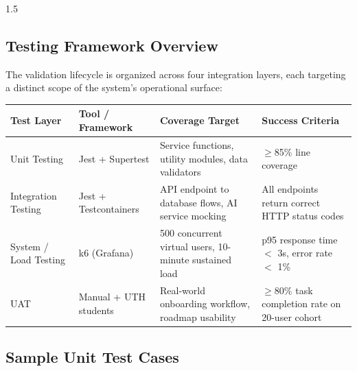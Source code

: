 \documentclass[12pt,a4paper]{report}
\begin{document}
\begin{spacing}{1.5}
		\subsection{Testing Framework Overview}
		
		The validation lifecycle is organized across four integration layers, each targeting a distinct scope of the system's operational surface:
		
		\begin{longtable}{|p{3cm}|p{3cm}|p{4cm}|p{5cm}|}
			\hline
			\rowcolor{gray!20}\textbf{Test Layer} & \textbf{Tool / Framework} & \textbf{Coverage Target} & \textbf{Success Criteria} \\ \hline
			Unit Testing & Jest + Supertest & Service functions, utility modules, data validators & $\geq$85\% line coverage \\ \hline
			Integration Testing & Jest + Testcontainers & API endpoint to database flows, AI service mocking & All endpoints return correct HTTP status codes \\ \hline
			System / Load Testing & k6 (Grafana) & 500 concurrent virtual users, 10-minute sustained load & p95 response time $<$ 3s, error rate $<$ 1\% \\ \hline
			UAT & Manual + UTH students & Real-world onboarding workflow, roadmap usability & $\geq$80\% task completion rate on 20-user cohort \\ \hline
		\end{longtable}
		
		\subsection{Sample Unit Test Cases}
		

\end{spacing}
\end{document}
